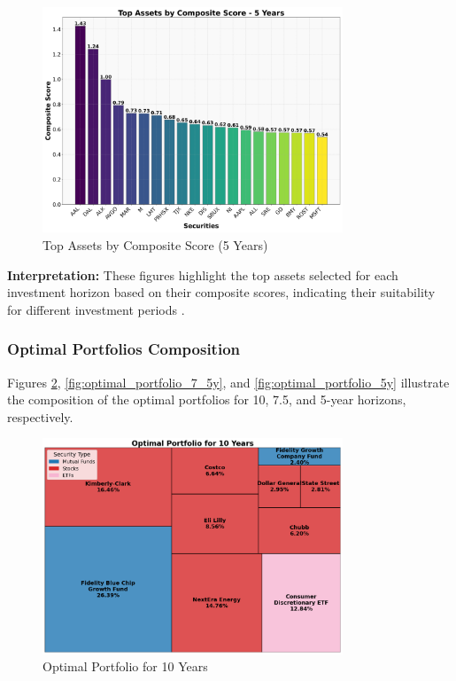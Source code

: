 \begin{figure}[!htbp]
    \centering
    \includegraphics[width=0.8\textwidth]{../Figures/top_assets_composite_score_5_years.png}
    \caption{Top Assets by Composite Score (5 Years)}
    \label{fig:top_assets_5y}
\end{figure}

\textbf{Interpretation:} These figures highlight the top assets selected for each investment horizon based on their composite scores, indicating their suitability for different investment periods \citep{sharpe1966mutual}.

\subsubsection{Optimal Portfolios Composition}
Figures \ref{fig:optimal_portfolio_10y}, \ref{fig:optimal_portfolio_7_5y}, and \ref{fig:optimal_portfolio_5y} illustrate the composition of the optimal portfolios for 10, 7.5, and 5-year horizons, respectively.

\begin{figure}[!htbp]
    \centering
    \includegraphics[width=0.8\textwidth]{../Figures/optimal_portfolio_10_years.png}
    \caption{Optimal Portfolio for 10 Years}
    \label{fig:optimal_portfolio_10y}
\end{figure}

